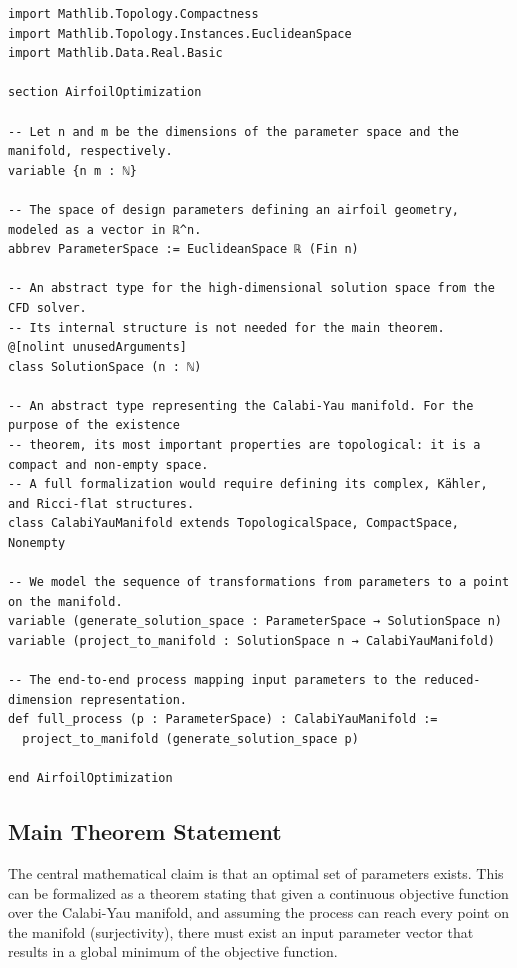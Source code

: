 \documentclass{article}
\begin{document}
\begin{verbatim}
import Mathlib.Topology.Compactness
import Mathlib.Topology.Instances.EuclideanSpace
import Mathlib.Data.Real.Basic

section AirfoilOptimization

-- Let n and m be the dimensions of the parameter space and the manifold, respectively.
variable {n m : ℕ}

-- The space of design parameters defining an airfoil geometry, modeled as a vector in ℝ^n.
abbrev ParameterSpace := EuclideanSpace ℝ (Fin n)

-- An abstract type for the high-dimensional solution space from the CFD solver.
-- Its internal structure is not needed for the main theorem.
@[nolint unusedArguments]
class SolutionSpace (n : ℕ)

-- An abstract type representing the Calabi-Yau manifold. For the purpose of the existence
-- theorem, its most important properties are topological: it is a compact and non-empty space.
-- A full formalization would require defining its complex, Kähler, and Ricci-flat structures.
class CalabiYauManifold extends TopologicalSpace, CompactSpace, Nonempty

-- We model the sequence of transformations from parameters to a point on the manifold.
variable (generate_solution_space : ParameterSpace → SolutionSpace n)
variable (project_to_manifold : SolutionSpace n → CalabiYauManifold)

-- The end-to-end process mapping input parameters to the reduced-dimension representation.
def full_process (p : ParameterSpace) : CalabiYauManifold :=
  project_to_manifold (generate_solution_space p)

end AirfoilOptimization
\end{verbatim}

\subsection{Main Theorem Statement}

The central mathematical claim is that an optimal set of parameters exists. This can be formalized as a theorem stating that given a continuous objective function over the Calabi-Yau manifold, and assuming the process can reach every point on the manifold (surjectivity), there must exist an input parameter vector that results in a global minimum of the objective function.
\end{document}
